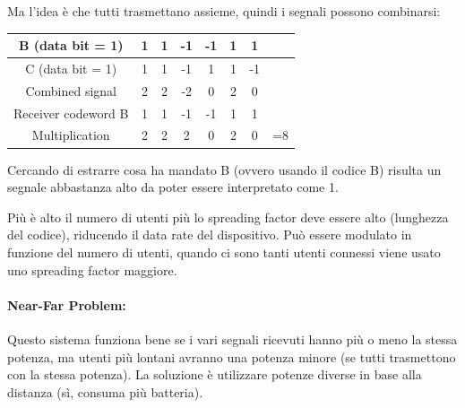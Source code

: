 Ma l'idea è che tutti trasmettano assieme, quindi i segnali possono combinarsi:
\begin{center}
	{
	\renewcommand{\arraystretch}{1.2}
	\begin{tabular}{|c|c|c|c|c|c|c|c|}
		\hline
		B (data bit = 1) & 1 & 1 & -1 & -1 & 1 & 1 &\\ 
		\hline
		C (data bit = 1) & 1 & 1 & -1 & 1 & 1 & -1 &\\ 
		\hline
		Combined signal & 2 & 2 & -2 & 0 & 2 & 0 & \\ 
		\hline
		Receiver codeword B & 1 & 1 & -1 & -1 & 1 & 1 & \\ 
		\hline
		Multiplication & 2 & 2 & 2 & 0 & 2 & 0 & =8 \\ 
		\hline
	\end{tabular}
	}
\end{center}
Cercando di estrarre cosa ha mandato B (ovvero usando il codice B) risulta un segnale abbastanza alto da poter essere interpretato come 1.

Più è alto il numero di utenti più lo spreading factor deve essere alto (lunghezza del codice), riducendo il data rate del dispositivo. Può essere modulato in funzione del numero di utenti, quando ci sono tanti utenti connessi viene usato uno spreading factor maggiore.

\paragraph{Near-Far Problem:} Questo sistema funziona bene se i vari segnali ricevuti hanno più o meno la stessa potenza, ma utenti più lontani avranno una potenza minore (se tutti trasmettono con la stessa potenza).
La soluzione è utilizzare potenze diverse in base alla distanza (sì, consuma più batteria).
